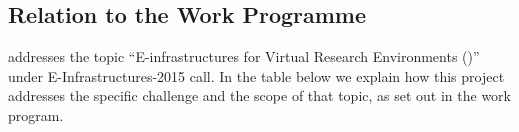 \subsection{Relation to the Work Programme}


\enlargethispage{4cm}

\TheProject addresses the topic ``E-infrastructures for Virtual Research
Environments (\VREs)'' under E-Infrastructures-2015 call. In the table
below we explain how this project addresses the specific challenge and
the scope of that topic, as set out in the work program.

